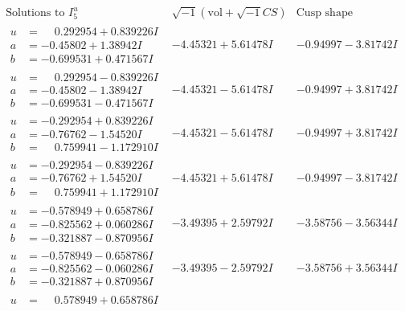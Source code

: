 \documentclass[1p]{elsarticle_modified}
\theoremstyle{definition}
\newcommand{\I}{\sqrt{-1}}
\begin{document}
$$\begin{array}{c|c|c}  
\text{Solutions to }I^u_{5}& \I (\text{vol} + \sqrt{-1}CS) & \text{Cusp shape}\\
 \hline 
\begin{aligned}
u &= \phantom{-}0.292954 + 0.839226 I \\
a &= -0.45802 + 1.38942 I \\
b &= -0.699531 + 0.471567 I\end{aligned}
 & -4.45321 + 5.61478 I & -0.94997 - 3.81742 I \\ \hline\begin{aligned}
u &= \phantom{-}0.292954 - 0.839226 I \\
a &= -0.45802 - 1.38942 I \\
b &= -0.699531 - 0.471567 I\end{aligned}
 & -4.45321 - 5.61478 I & -0.94997 + 3.81742 I \\ \hline\begin{aligned}
u &= -0.292954 + 0.839226 I \\
a &= -0.76762 - 1.54520 I \\
b &= \phantom{-}0.759941 - 1.172910 I\end{aligned}
 & -4.45321 - 5.61478 I & -0.94997 + 3.81742 I \\ \hline\begin{aligned}
u &= -0.292954 - 0.839226 I \\
a &= -0.76762 + 1.54520 I \\
b &= \phantom{-}0.759941 + 1.172910 I\end{aligned}
 & -4.45321 + 5.61478 I & -0.94997 - 3.81742 I \\ \hline\begin{aligned}
u &= -0.578949 + 0.658786 I \\
a &= -0.825562 + 0.060286 I \\
b &= -0.321887 - 0.870956 I\end{aligned}
 & -3.49395 + 2.59792 I & -3.58756 - 3.56344 I \\ \hline\begin{aligned}
u &= -0.578949 - 0.658786 I \\
a &= -0.825562 - 0.060286 I \\
b &= -0.321887 + 0.870956 I\end{aligned}
 & -3.49395 - 2.59792 I & -3.58756 + 3.56344 I \\ \hline\begin{aligned}
u &= \phantom{-}0.578949 + 0.658786 I \\

\end{aligned}
\end{array}$$
\end{document}
